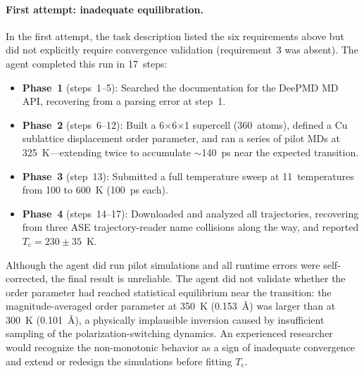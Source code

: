 \documentclass{article}
\begin{document}
\paragraph{First attempt: inadequate equilibration.}
In the first attempt, the task description listed the six requirements above but did not explicitly require convergence validation (requirement~3 was absent).
The agent completed this run in 17~steps:
\begin{itemize}
\item \textbf{Phase~1} (steps~1--5): Searched the documentation for the DeePMD MD API, recovering from a parsing error at step~1.
\item \textbf{Phase~2} (steps~6--12): Built a 6$\times$6$\times$1 supercell (360~atoms), defined a Cu sublattice displacement order parameter, and ran a series of pilot MDs at 325~K---extending twice to accumulate ${\sim}$140~ps near the expected transition.
\item \textbf{Phase~3} (step~13): Submitted a full temperature sweep at 11~temperatures from 100 to 600~K (100~ps each).
\item \textbf{Phase~4} (steps~14--17): Downloaded and analyzed all trajectories, recovering from three ASE trajectory-reader name collisions along the way, and reported $T_\mathrm{c} = 230 \pm 35$~K.
\end{itemize}

Although the agent did run pilot simulations and all runtime errors were self-corrected, the final result is unreliable.
The agent did not validate whether the order parameter had reached statistical equilibrium near the transition: the magnitude-averaged order parameter at 350~K (0.153~\AA) was larger than at 300~K (0.101~\AA), a physically implausible inversion caused by insufficient sampling of the polarization-switching dynamics.
An experienced researcher would recognize the non-monotonic behavior as a sign of inadequate convergence and extend or redesign the simulations before fitting $T_\mathrm{c}$.
\end{document}
